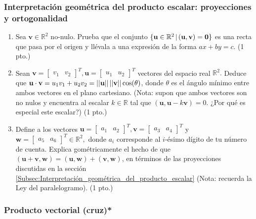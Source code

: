 \documentclass[12pt]{article}
\begin{document}
\subsubsection{Interpretación geométrica del producto escalar: proyecciones y ortogonalidad}
\begin{enumerate}
    \item Sea $\mathbf{v}\in\mathbb{R}^2$ no-nulo. Prueba que el conjunto $\{\mathbf{u}\in\mathbb{R}^2\hspace{0.5mm} |\hspace{0.5mm} (\mathbf{u},\mathbf{v)=0}\}$ es una recta que pasa por el origen y llévala a una expresión de la forma $ax+by=c.$ (1 pto.)
    \item Sean $\mathbf{v}=\begin{bmatrix} v_1 & v_2 \end{bmatrix}^T, \mathbf{u}=\begin{bmatrix}u_1 & u_2 \end{bmatrix}^T$ vectores del espacio real $\mathbb{R}^2.$ Deduce que $\mathbf{u}\cdot\mathbf{v}=u_1v_1+u_2v_2=||\mathbf{u}||\hspace{0.5mm}||\mathbf{v}||\cos(\theta)$, donde $\theta$ es el ángulo mínimo entre ambos vectores en el plano cartesiano. (Nota: supon que ambos vectores son no nulos y encuentra al escalar $k\in\mathbb{R}$ tal que $(\mathbf{u},\mathbf{u}-k\mathbf{v})=0$. ¿Por qué es especial este escalar?) (1 pto.)
    \item Define a los vectores $\mathbf{u}=\begin{bmatrix} a_1 & a_2 \end{bmatrix}^T, \mathbf{v}=\begin{bmatrix} a_3 & a_4\end{bmatrix}^T$ y $\mathbf{w}=\begin{bmatrix} a_5 & a_6\end{bmatrix}^T\in\mathbb{R}^2,$ donde $a_i$ corresponde al $i$-ésimo dígito de tu número de cuenta. Explica gométricamente el hecho de que $(\mathbf{u}+\mathbf{v},\mathbf{w})=(\mathbf{u},\mathbf{w})+(\mathbf{v},\mathbf{w})$, en términos de las proyecciones discutidas en la sección \ref{Subsec:Interpretación_geométrica_del_producto_escalar} (Nota: recuerda la Ley del paralelogramo). (1 pto.)
\end{enumerate}

\subsubsection{Producto vectorial (cruz)*}
\end{document}
